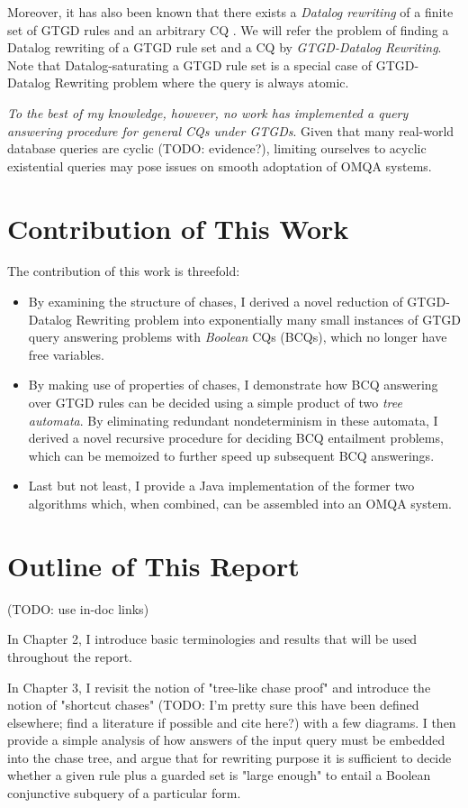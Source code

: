 \documentclass[12pt]{report}
\theoremstyle{plain}
\theoremstyle{definition}
\begin{document}
Moreover, it has also been known that there exists a \emph{Datalog rewriting} of a finite set of GTGD rules and an arbitrary CQ \cite{barany_benedikt_cate_2013}. We will refer the problem of finding a Datalog rewriting of a GTGD rule set and a CQ by \emph{GTGD-Datalog Rewriting}. Note that Datalog-saturating a GTGD rule set is a special case of GTGD-Datalog Rewriting problem where the query is always atomic.

\emph{To the best of my knowledge, however, no work has implemented a query answering procedure for general CQs under GTGDs}. Given that many real-world database queries are cyclic (TODO: evidence?), limiting ourselves to acyclic existential queries may pose issues on smooth adoptation of OMQA systems.

\section{Contribution of This Work}

The contribution of this work is threefold:

\begin{itemize}
  \item By examining the structure of chases, I derived a novel reduction of GTGD-Datalog Rewriting problem into exponentially many small instances of GTGD query answering problems with \emph{Boolean} CQs (BCQs), which no longer have free variables.
  \item By making use of properties of chases, I demonstrate how BCQ answering over GTGD rules can be decided using a simple product of two \emph{tree automata}. By eliminating redundant nondeterminism in these automata, I derived a novel recursive procedure for deciding BCQ entailment problems, which can be memoized to further speed up subsequent BCQ answerings.
  \item Last but not least, I provide a Java implementation of the former two algorithms which, when combined, can be assembled into an OMQA system.
\end{itemize}

\section{Outline of This Report}

(TODO: use in-doc links)

In Chapter 2, I introduce basic terminologies and results that will be used throughout the report.

In Chapter 3, I revisit the notion of "tree-like chase proof" and introduce the notion of "shortcut chases" (TODO: I'm pretty sure this have been defined elsewhere; find a literature if possible and cite here?) with a few diagrams. I then provide a simple analysis of how answers of the input query must be embedded into the chase tree, and argue that for rewriting purpose it is sufficient to decide whether a given rule plus a guarded set is "large enough" to entail a Boolean conjunctive subquery of a particular form.
\end{document}
